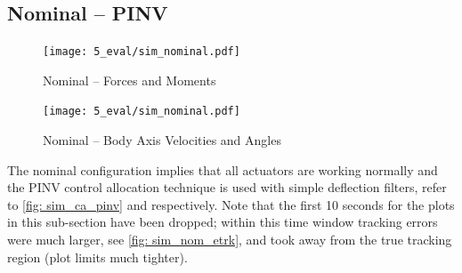 \documentclass[12pt]{ucthesis}
\begin{document}
\subsection{Nominal -- PINV}
\label{subsec: nominal}
%
\begin{figure}
\vspace{-60pt}
		\centering
		\texttt{[image: 5\_eval/sim\_nominal.pdf]}%
		\caption{Nominal -- Forces and Moments}
		\label{fig: sim_nom_fm}
\vspace{20pt}
		\texttt{[image: 5\_eval/sim\_nominal.pdf]}%
		\caption{Nominal -- Body Axis Velocities and Angles}
		\label{fig: sim_nom_eul}
\end{figure}
%
The nominal configuration implies that all actuators are working normally and the PINV control allocation technique is used with simple deflection filters, refer to \autoref{fig: sim_ca_pinv} and  respectively. Note that the first 10 seconds for the plots in this sub-section have been dropped; within this time window tracking errors were much larger, see \autoref{fig: sim_nom_etrk}, and took away from the true tracking region (plot limits much tighter).
\end{document}
